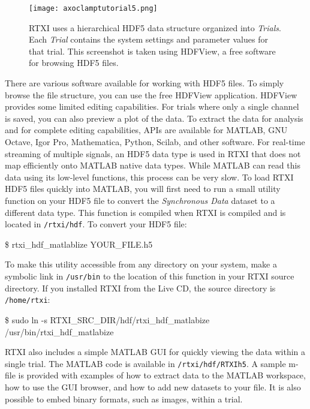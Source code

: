 \begin{figure}[h!]
\begin{maxipage}
\begin{center}
\texttt{[image: axoclamptutorial5.png]} 
\caption[HDF5]{RTXI uses a hierarchical HDF5 data structure organized into \emph{Trials}. Each \emph{Trial} contains the system settings and parameter values for that trial. This screenshot is taken using HDFView, a free software for browsing HDF5 files.} 
\label{fig:HDF5 structure}
\end{center}
\end{maxipage}
\end{figure}

There are various software available for working with HDF5 files. To simply browse the file structure, you can use the free HDFView application. HDFView provides some limited editing capabilities. For trials where only a single channel is saved, you can also preview a plot of the data. To extract the data for analysis and for complete editing capabilities, APIs are available for MATLAB, GNU Octave, Igor Pro, Mathematica, Python, Scilab, and other software. For real-time streaming of multiple signals, an HDF5 data type is used in RTXI that does not map efficiently onto MATLAB native data types. While MATLAB can read this data using its low-level functions, this process can be very slow. To load RTXI HDF5 files quickly into MATLAB, you will first need to run a small utility function on your HDF5 file to convert the \emph{Synchronous Data} dataset to a different data type. This function is compiled when RTXI is compiled and is located in \texttt{/rtxi/hdf}. To convert your HDF5 file:
\begin{example}
\$ rtxi\_hdf\_matlablize YOUR\_FILE.h5
\end{example}

To make this utility accessible from any directory on your system, make a symbolic link in \texttt{/usr/bin} to the location of this function in your RTXI source directory. If you installed RTXI from the Live CD, the source directory is \texttt{/home/rtxi}:
\begin{example}
\$ sudo ln -s RTXI\_SRC\_DIR/hdf/rtxi\_hdf\_matlabize \\ \hspace{1cm} /usr/bin/rtxi\_hdf\_matlabize
\end{example}

RTXI also includes a simple MATLAB GUI for quickly viewing the data within a single trial. The MATLAB code is available in \texttt{/rtxi/hdf/RTXIh5}. A sample m-file is provided with examples of how to extract data to the MATLAB workspace, how to use the GUI browser, and how to add new datasets to your file. It is also possible to embed binary formats, such as images, within a trial.

